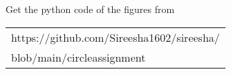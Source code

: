 \documentclass[journal,12pt,twocolumn]
{IEEEtran}
\begin{document}
\vspace{0.6cm}
Get the python code of the figures from
\begin{table}[h]
\large
\centering
\begin{tabular}{|l|}
\hline
https://github.com/Sireesha1602/sireesha/
\\blob/main/circleassignment\\
\hline
\end{tabular}

\end{table}
\end{document}
